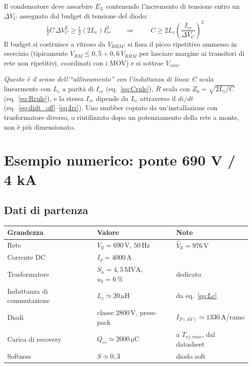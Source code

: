 \documentclass[11pt,a4paper]{article}
\newcommand{\unit}[1]{\,\mathrm{#1}}
\begin{document}
Il condensatore deve assorbire $E_L$ contenendo l'incremento di tensione
entro un $\Delta V_C$ assegnato dal budget di tensione del diodo:
\begin{equation}
\tfrac{1}{2} C\,\Delta V_C^2 \ge \tfrac{1}{2}(2L_c) I_{rr}^2
\qquad\Longrightarrow\qquad
\boxed{\;
C \ge 2L_c \left(\frac{I_{rr}}{\Delta V_C}\right)^{\!2}
\;}
\label{eq:Crule}
\end{equation}
Il budget si costruisce a ritroso da $V_{RRM}$: si fissa il picco
ripetitivo ammesso in esercizio (tipicamente
$V_{RM} \le 0{,}5\div0{,}6\,V_{RRM}$ per lasciare margine ai transitori di
rete non ripetitivi, coordinati con i MOV) e si sottrae $V_{com}$.

\emph{Questo \`e il senso dell'``allineamento'' con l'induttanza di
linea}: $C$ scala linearmente con $L_c$ a parit\`a di $I_{rr}$
(eq.~\ref{eq:Crule}), $R$ scala con $Z_0=\sqrt{2L_c/C}$
(eq.~\ref{eq:Rrule}), e la stessa $I_{rr}$ dipende da $L_c$ attraverso il
$di/dt$ (eq.~\ref{eq:didt_off}--\ref{eq:Irr}). Uno snubber copiato da
un'installazione con trasformatore diverso, o riutilizzato dopo un
potenziamento della rete a monte, non \`e pi\`u dimensionato.

\section{Esempio numerico: ponte 690 V / 4 kA}
\label{sec:esempio}

\subsection{Dati di partenza}

\begin{center}
\begin{tabular}{lll}
\toprule
Grandezza & Valore & Note \\
\midrule
Rete & $V_{ll}=690\unit{V}$, $50\unit{Hz}$ & $\hat{V}_{ll}=976\unit{V}$ \\
Corrente DC & $I_d = 4000\unit{A}$ & \\
Trasformatore & $S_n = 4{,}5\unit{MVA}$, $u_k = 6\,\%$ & dedicato \\
Induttanza di commutazione & $L_c \simeq 20\unit{\mu H}$ & da eq.~\eqref{eq:Lc} \\
Diodi & classe $2800\unit{V}$, press-pack & $I_{F(AV)}\simeq1330\unit{A}$/ramo \\
Carica di recovery & $Q_{rr} \simeq 2000\unit{\mu C}$ & a $T_{vj,max}$, dal datasheet \\
Softness & $S \simeq 0{,}3$ & diodo soft \\
\bottomrule
\end{tabular}
\end{center}
\end{document}
